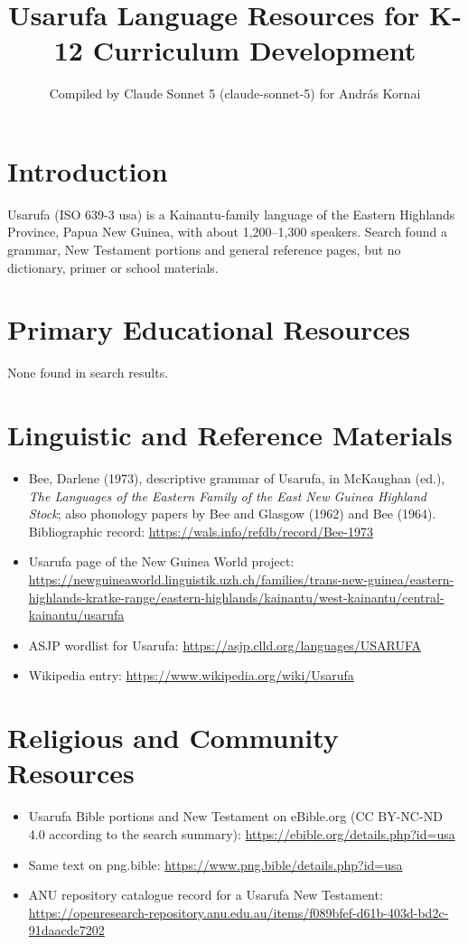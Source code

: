 \documentclass[12pt]{article}
\title{Usarufa Language Resources for K-12 Curriculum Development}
\author{Compiled by Claude Sonnet 5 (claude-sonnet-5) for Andr\'as Kornai}
\date{}
\begin{document}
\maketitle
\section{Introduction}
Usarufa (ISO 639-3 usa) is a Kainantu-family language of the Eastern Highlands Province, Papua New Guinea, with about 1,200--1,300 speakers. Search found a grammar, New Testament portions and general reference pages, but no dictionary, primer or school materials.
\section{Primary Educational Resources}
None found in search results.
\section{Linguistic and Reference Materials}
\begin{itemize}
\item Bee, Darlene (1973), descriptive grammar of Usarufa, in McKaughan (ed.), \emph{The Languages of the Eastern Family of the East New Guinea Highland Stock}; also phonology papers by Bee and Glasgow (1962) and Bee (1964). Bibliographic record: \url{https://wals.info/refdb/record/Bee-1973}
\item Usarufa page of the New Guinea World project: \url{https://newguineaworld.linguistik.uzh.ch/families/trans-new-guinea/eastern-highlands-kratke-range/eastern-highlands/kainantu/west-kainantu/central-kainantu/usarufa}
\item ASJP wordlist for Usarufa: \url{https://asjp.clld.org/languages/USARUFA}
\item Wikipedia entry: \url{https://www.wikipedia.org/wiki/Usarufa}
\end{itemize}
\section{Religious and Community Resources}
\begin{itemize}
\item Usarufa Bible portions and New Testament on eBible.org (CC BY-NC-ND 4.0 according to the search summary): \url{https://ebible.org/details.php?id=usa}
\item Same text on png.bible: \url{https://www.png.bible/details.php?id=usa}
\item ANU repository catalogue record for a Usarufa New Testament: \url{https://openresearch-repository.anu.edu.au/items/f089bfef-d61b-403d-bd2c-91daacdc7202}
\end{itemize}
\end{document}
